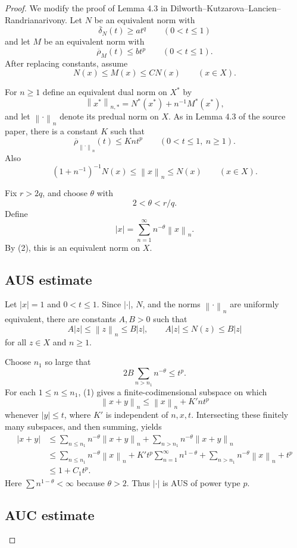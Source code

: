 \documentclass[11pt]{article}
\newcommand{\norm}[1]{\left\lVert #1 \right\rVert}
\newcommand{\rhoBar}{\overline{\rho}}
\newcommand{\deltaBar}{\overline{\delta}}
\begin{document}
\begin{proof}
We modify the proof of Lemma 4.3 in Dilworth--Kutzarova--Lancien--
Randrianarivony. Let $N$ be an equivalent norm with
\[
  \deltaBar_N(t)\ge a t^q\qquad (0<t\le 1)
\]
and let $M$ be an equivalent norm with
\[
  \rhoBar_M(t)\le b t^p\qquad (0<t\le 1).
\]
After replacing constants, assume
\[
  N(x)\le M(x)\le C N(x)\qquad (x\in X).
\]

For $n\ge 1$ define an equivalent dual norm on $X^*$ by
\[
  \norm{x^*}_{n,*}=N^*(x^*)+n^{-1}M^*(x^*),
\]
and let $\norm{\cdot}_n$ denote its predual norm on $X$. As in Lemma 4.3 of
the source paper, there is a constant $K$ such that
\[
  \rhoBar_{\norm{\cdot}_n}(t)\le K n t^p
  \qquad (0<t\le 1,\ n\ge 1).                 \tag{1}
\]
Also
\[
  (1+n^{-1})^{-1}N(x)\le \norm{x}_n\le N(x)
  \qquad (x\in X).                            \tag{2}
\]

Fix $r>2q$, and choose $\theta$ with
\[
  2<\theta<r/q.
\]
Define
\[
  |x|=\sum_{n=1}^{\infty} n^{-\theta}\norm{x}_n .
\]
By (2), this is an equivalent norm on $X$.

\subsection*{AUS estimate}

Let $|x|=1$ and $0<t\le 1$. Since $|\cdot|$, $N$, and the norms
$\norm{\cdot}_n$ are uniformly equivalent, there are constants $A,B>0$ such
that
\[
  A|z|\le \norm{z}_n\le B|z|,
  \qquad
  A|z|\le N(z)\le B|z|
\]
for all $z\in X$ and $n\ge 1$.

Choose $n_1$ so large that
\[
  2B\sum_{n>n_1} n^{-\theta}\le t^p .
\]
For each $1\le n\le n_1$, (1) gives a finite-codimensional subspace on which
\[
  \norm{x+y}_n\le \norm{x}_n+K' n t^p
\]
whenever $|y|\le t$, where $K'$ is independent of $n,x,t$. Intersecting these
finitely many subspaces, and then summing, yields
\[
\begin{aligned}
  |x+y|
  &\le \sum_{n\le n_1}n^{-\theta}\norm{x+y}_n
       +\sum_{n>n_1}n^{-\theta}\norm{x+y}_n\\
  &\le \sum_{n\le n_1}n^{-\theta}\norm{x}_n
       +K't^p\sum_{n=1}^{\infty}n^{1-\theta}
       +\sum_{n>n_1}n^{-\theta}\norm{x}_n+t^p\\
  &\le 1+C_1t^p .
\end{aligned}
\]
Here $\sum n^{1-\theta}<\infty$ because $\theta>2$. Thus $|\cdot|$ is AUS of
power type $p$.

\subsection*{AUC estimate}


\end{proof}
\end{document}
